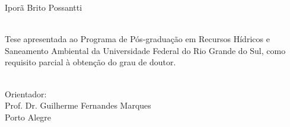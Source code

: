 \documentclass[./main.tex]{subfiles}
\begin{document}
\doublespacing %
\large

\newpage
\renewcommand{\headrulewidth}{0pt}
\thispagestyle{fancy}
\fancyhf{} %
\fancyfoot{} %
\fancyfoot[C]{\thepage}

\begin{center}
	\selectfont Iporã Brito Possantti\\
	\vspace{60mm}
	\selectfont \docTitle\\
	\vspace{20mm}
\end{center}
\begin{adjustwidth}{150pt}{0pt}
	\singlespacing
        \small
	\selectfont Tese apresentada ao Programa de Pós-graduação em Recursos Hídricos e Saneamento Ambiental da Universidade Federal do Rio Grande do Sul, como requisito parcial à obtenção do grau de doutor. \\ \\ 
\end{adjustwidth}
\begin{center}
        \selectfont Orientador:\\
        \selectfont Prof. Dr. Guilherme Fernandes Marques \\
	\vspace{70mm}
	\selectfont Porto Alegre\\
\end{center}
\clearpage
\end{document}
